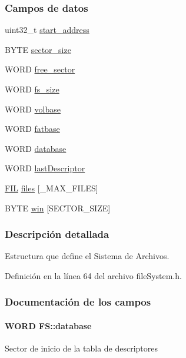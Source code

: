 \subsubsection*{Campos de datos}
\begin{DoxyCompactItemize}
\item 
uint32\+\_\+t \hyperlink{structFS_a22eed025311346b8029d8b445c192b95}{start\+\_\+address}
\item 
B\+Y\+T\+E \hyperlink{structFS_a06559d64af1c2b15af05165f30c59868}{sector\+\_\+size}
\item 
W\+O\+R\+D \hyperlink{structFS_adae8dcbe72b934a870bf663481207e3e}{free\+\_\+sector}
\item 
W\+O\+R\+D \hyperlink{structFS_ab8f2ed716ba1865bff2fe82d36e90546}{fs\+\_\+size}
\item 
W\+O\+R\+D \hyperlink{structFS_a6b431a5035eb3bb668565772a3ecd57a}{volbase}
\item 
W\+O\+R\+D \hyperlink{structFS_a7c6676234fc0734f2139c627a0b01428}{fatbase}
\item 
W\+O\+R\+D \hyperlink{structFS_a727068deba19f90b5b402ae005f49b58}{database}
\item 
W\+O\+R\+D \hyperlink{structFS_a050f921ab2140aa4eadce4a140b61fbe}{last\+Descriptor}
\item 
\hyperlink{structFIL}{F\+I\+L} \hyperlink{structFS_a5772298ea6aafc77f842037933531a02}{files} \mbox{[}\+\_\+\+M\+A\+X\+\_\+\+F\+I\+L\+E\+S\mbox{]}
\item 
B\+Y\+T\+E \hyperlink{structFS_a23d4e26f31e8932d8b216955e6af2130}{win} \mbox{[}S\+E\+C\+T\+O\+R\+\_\+\+S\+I\+Z\+E\mbox{]}
\end{DoxyCompactItemize}


\subsubsection{Descripción detallada}
Estructura que define el Sistema de Archivos. 

Definición en la línea 64 del archivo file\+System.\+h.



\subsubsection{Documentación de los campos}
\hypertarget{structFS_a727068deba19f90b5b402ae005f49b58}{
\paragraph[{database}]{\setlength{\rightskip}{0pt plus 5cm}W\+O\+R\+D F\+S\+::database}}\label{structFS_a727068deba19f90b5b402ae005f49b58}
Sector de inicio de la tabla de descriptores 

